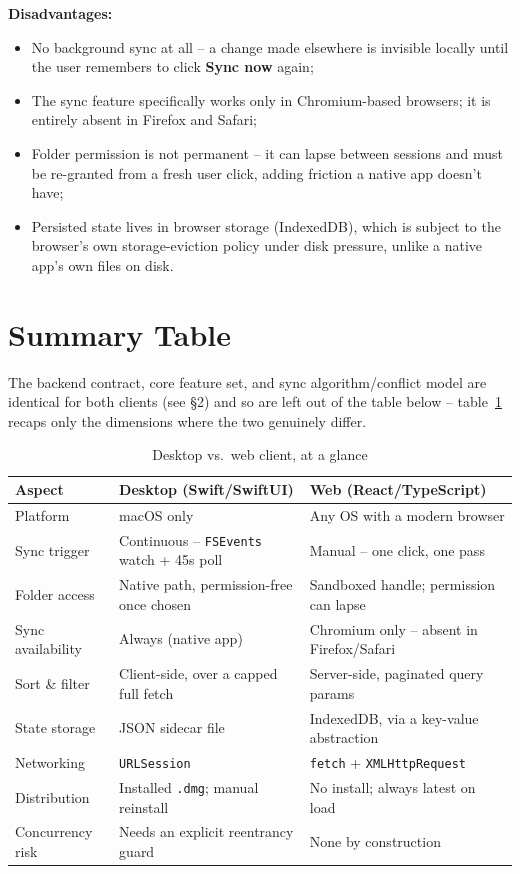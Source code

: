 \documentclass[12pt,a4paper]{article}
\begin{document}
\textbf{Disadvantages:}
\begin{itemize}[nosep]
    \item No background sync at all -- a change made elsewhere is invisible locally until the user remembers to click \textbf{Sync now} again;
    \item The sync feature specifically works only in Chromium-based browsers; it is entirely absent in Firefox and Safari;
    \item Folder permission is not permanent -- it can lapse between sessions and must be re-granted from a fresh user click, adding friction a native app doesn't have;
    \item Persisted state lives in browser storage (IndexedDB), which is subject to the browser's own storage-eviction policy under disk pressure, unlike a native app's own files on disk.
\end{itemize}

\section{Summary Table}

The backend contract, core feature set, and sync algorithm/conflict model are identical for both clients (see \S2) and so are left out of the table below -- table~\ref{tab:summary} recaps only the dimensions where the two genuinely differ.

\small
\renewcommand{\arraystretch}{1.3}
\begin{longtable}{@{}p{2.7cm}p{6.35cm}p{6.35cm}@{}}
\caption{Desktop vs.\ web client, at a glance}
\label{tab:summary} \\
\toprule
\textbf{Aspect} & \textbf{Desktop (Swift/SwiftUI)} & \textbf{Web (React/TypeScript)} \\
\midrule
\endhead
Platform & macOS only & Any OS with a modern browser \\
Sync trigger & Continuous -- \texttt{FSEvents} watch + 45s poll & Manual -- one click, one pass \\
Folder access & Native path, permission-free once chosen & Sandboxed handle; permission can lapse \\
Sync availability & Always (native app) & Chromium only -- absent in Firefox/Safari \\
Sort \& filter & Client-side, over a capped full fetch & Server-side, paginated query params \\
State storage & JSON sidecar file & IndexedDB, via a key-value abstraction \\
Networking & \texttt{URLSession} & \texttt{fetch} + \texttt{XMLHttpRequest} \\
Distribution & Installed \texttt{.dmg}; manual reinstall & No install; always latest on load \\
Concurrency risk & Needs an explicit reentrancy guard & None by construction \\
\bottomrule
\end{longtable}
\renewcommand{\arraystretch}{1}
\end{document}
